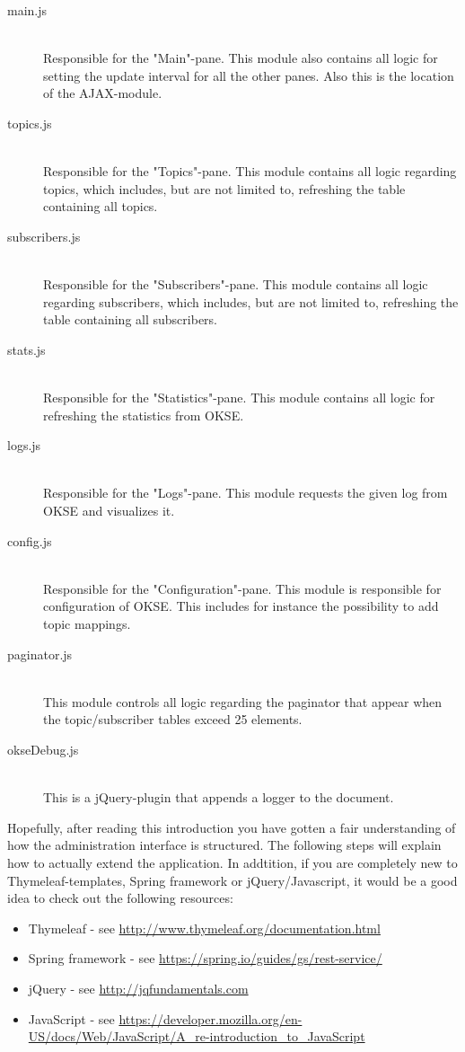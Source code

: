 \begin{description}
    \item[main.js] \hfill \\ Responsible for the "Main"-pane. This module also contains all logic for setting the update interval for all the other panes. Also this is the location of the AJAX-module. 
    \item[topics.js] \hfill \\ Responsible for the "Topics"-pane. This module contains all logic regarding topics, which includes, but are not limited to, refreshing the table containing all topics. 
    \item[subscribers.js] \hfill \\ Responsible for the "Subscribers"-pane. This module contains all logic regarding subscribers, which includes, but are not limited to, refreshing the table containing all subscribers. 
    \item[stats.js] \hfill \\ Responsible for the "Statistics"-pane. This module contains all logic for refreshing the statistics from OKSE.
    \item[logs.js] \hfill \\ Responsible for the "Logs"-pane. This module requests the given log from OKSE and visualizes it.
    \item[config.js] \hfill \\ Responsible for the "Configuration"-pane. This module is responsible for configuration of OKSE. This includes for instance the possibility to add topic mappings. 
    \item[paginator.js] \hfill \\ This module controls all logic regarding the paginator that appear when the topic/subscriber tables exceed 25 elements. 
    \item[okseDebug.js] \hfill \\ This is a jQuery-plugin that appends a logger to the document.
\end{description}

Hopefully, after reading this introduction you have gotten a fair understanding of how the administration interface is structured. The following steps will explain how to actually extend the application. In addtition, if you are completely new to Thymeleaf-templates, Spring framework or jQuery/Javascript, it would be a good idea to check out the following resources: 

\begin{itemize}
\setlength{\itemsep}{0cm}%
\item Thymeleaf - see \url{http://www.thymeleaf.org/documentation.html}
\item Spring framework - see \url{https://spring.io/guides/gs/rest-service/}
\item jQuery - see \url{http://jqfundamentals.com}
\item JavaScript - see \url{https://developer.mozilla.org/en-US/docs/Web/JavaScript/A_re-introduction_to_JavaScript}
\end{itemize}

